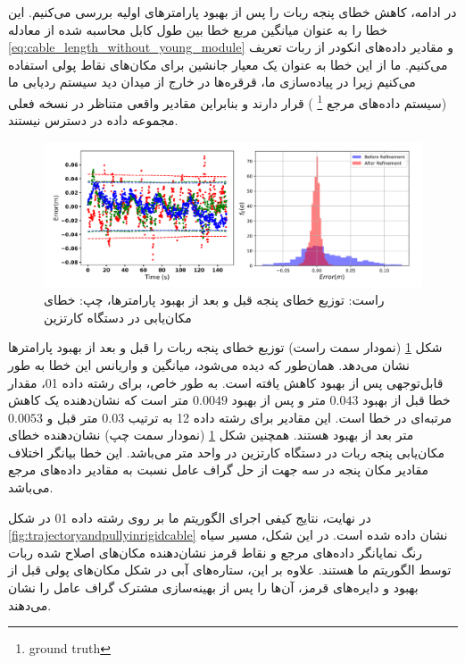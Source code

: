 در ادامه، کاهش خطای پنجه ربات را پس از بهبود پارامترهای اولیه بررسی می‌کنیم. این خطا را به عنوان میانگین مربع خطا بین طول کابل محاسبه شده از معادله 
\ref{eq:cable_length_without_young_module}
 و مقادیر داده‌های انکودر از ربات تعریف می‌کنیم. ما از این خطا به عنوان یک معیار جانشین برای مکان‌های نقاط پولی استفاده می‌کنیم زیرا در پیاده‌سازی ما، قرقره‌ها در خارج از میدان دید سیستم ردیابی ما (سیستم داده‌های مرجع
\footnote{ground truth}
 ) قرار دارند و بنابراین مقادیر واقعی متناظر در نسخه فعلی مجموعه داده در دسترس نیستند. 
 
 \begin{figure}
 	\centering
 	\includegraphics[width=0.9\linewidth]{img/calibration_result_rigid}
 	\caption{ راست: توزیع خطای پنجه قبل و بعد از بهبود پارامترها، چپ: خطای مکان‌یابی در دستگاه کارتزین}
 	\label{fig:calibrationresultrigid}
 \end{figure}
 
 شکل 
 \ref{fig:calibrationresultrigid}
 (نمودار سمت راست)
 توزیع خطای پنجه ربات را قبل و بعد از بهبود پارامترها نشان می‌دهد. همان‌طور که دیده می‌شود، میانگین و واریانس این خطا به طور قابل‌توجهی پس از بهبود کاهش یافته است. به طور خاص، برای رشته داده 01، مقدار خطا قبل از بهبود $0.043$ متر و پس از بهبود $0.0049$ متر است که نشان‌دهنده یک کاهش مرتبه‌ای در خطا است. این مقادیر برای رشته داده 12 به ترتیب $0.03$ متر قبل و $0.0053$ متر بعد از بهبود هستند. همچنین شکل 
  \ref{fig:calibrationresultrigid}
  (نمودار سمت چپ)
  نشان‌دهنده خطای مکان‌یابی پنجه ربات در دستگاه کارتزین در واحد متر می‌باشد. این خطا بیانگر اختلاف مقادیر مکان پنجه در سه جهت از حل گراف عامل نسبت به مقادیر داده‌های مرجع می‌باشد.

در نهایت، نتایج کیفی اجرای الگوریتم ما بر روی رشته داده 01 در شکل 
\ref{fig:trajectoryandpullyinrigidcable} 
نشان داده شده است. در این شکل، مسیر سیاه رنگ نمایانگر داده‌های مرجع و نقاط قرمز نشان‌دهنده مکان‌های اصلاح شده ربات توسط الگوریتم ما هستند. علاوه بر این، ستاره‌های آبی در شکل مکان‌های پولی قبل از بهبود و دایره‌های قرمز، آن‌ها را پس از بهینه‌سازی مشترک گراف عامل را نشان می‌دهند.

